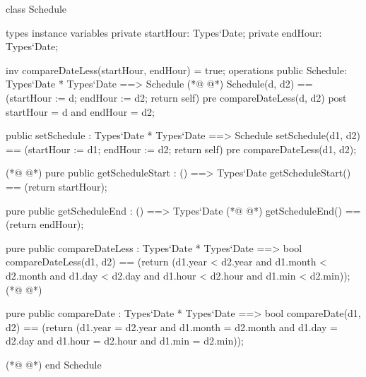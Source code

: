 \begin{vdmpp}[breaklines=true]
class Schedule

types
instance variables
  private startHour: Types`Date;
  private endHour: Types`Date;
  
  inv compareDateLess(startHour, endHour) = true;
operations 
 public Schedule: Types`Date * Types`Date ==> Schedule
(*@
\label{Schedule:11}
@*)
  Schedule(d, d2) == (startHour := d; endHour := d2; return self)
 pre compareDateLess(d, d2)
 post startHour = d and endHour = d2;
 
 public setSchedule : Types`Date * Types`Date ==> Schedule
  setSchedule(d1, d2) == (startHour := d1; endHour := d2; return self)
 pre compareDateLess(d1, d2);
  
(*@
\label{setEndHour:19}
@*)
 pure public getScheduleStart : () ==> Types`Date
  getScheduleStart() == (return startHour);
  
 pure public getScheduleEnd : () ==> Types`Date
(*@
\label{setStartHour:23}
@*)
  getScheduleEnd() == (return endHour);
  
 pure public compareDateLess : Types`Date * Types`Date ==> bool
  compareDateLess(d1, d2) == (return (d1.year < d2.year and d1.month < d2.month and d1.day < d2.day and d1.hour < d2.hour and d1.min < d2.min));
(*@
\label{setSchedule:27}
@*)
  
 pure public compareDate : Types`Date * Types`Date ==> bool
  compareDate(d1, d2) == (return (d1.year = d2.year and d1.month = d2.month and d1.day = d2.day and d1.hour = d2.hour and d1.min = d2.min));

(*@
\label{getScheduleStart:31}
@*)
end Schedule
\end{vdmpp}

